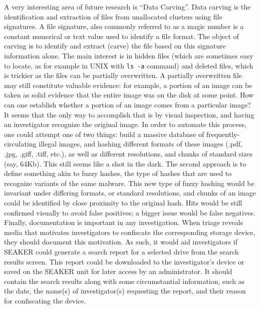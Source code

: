 \documentclass[12pt]{article}
\begin{document}
A very interesting area of future research is ``Data Carving''. Data carving is the identification and extraction
of files from unallocated clusters using file signatures. A file signature, also commonly referred to as a
magic number is a constant numerical or text value used to identify a file format. The object of carving
is to identify and extract (carve) the file based on this signature information alone. The main interest is in
hidden files (which are sometimes easy to locate, as for example in UNIX with \verb|ls -a| command) and
deleted files, which is trickier as the files can be partially overwritten. A partially overwritten file may
still constitute valuable evidence: for example, a portion of an image can be taken as solid evidence that
the entire image was on the disk at some point. How can one establish whether a portion of an image
comes from a particular image? It seems that the only way to accomplish that is by visual inspection,
and having an investigator recognize the original image. In order to automate this process, one could
attempt one of two things: build a massive database of frequently-circulating illegal images, and
hashing different formats of these images (.pdf, .jpg, .giff, .tiff, etc.), as well as different resolutions,
and chunks of standard sizes (say, 64Kb). This still seems like a shot in the dark. The second approach
is to define something akin to fuzzy hashes, the type of hashes that are used to recognize variants of the
same malware. This new type of fuzzy hashing would be invariant under differing formats, or standard
resolutions, and chunks of an image could be identified by close proximity to the original hash. Hits
would be still confirmed visually to avoid false positives; a bigger issue would be false negatives.\\

Finally, documentation is important in any investigation. When triage reveals media that motivates
investigators to confiscate the corresponding storage device, they should document this motivation. As
such, it would aid investigators if SEAKER could generate a search report for a selected drive from
the search results screen. This report could be downloaded to the investigator’s device or saved on the
SEAKER unit for later access by an administrator. It should contain the search results along with some
circumstantial information, such as the date, the name(s) of investigator(s) requesting the report, and
their reason for confiscating the device.\\
\end{document}
